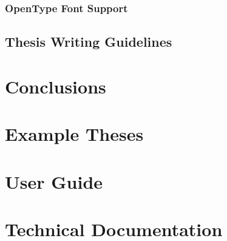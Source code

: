 \documentclass{article}
\begin{document}
  \subsubsection{OpenType Font Support}
  \subsection{Thesis Writing Guidelines}
  \section{Conclusions}
  \renewcommand\thesection{\Alph{section}}
  \setcounter{section}{0}
  \section{Example Theses}
  \section{User Guide}
  \section{Technical Documentation}
\end{document}

